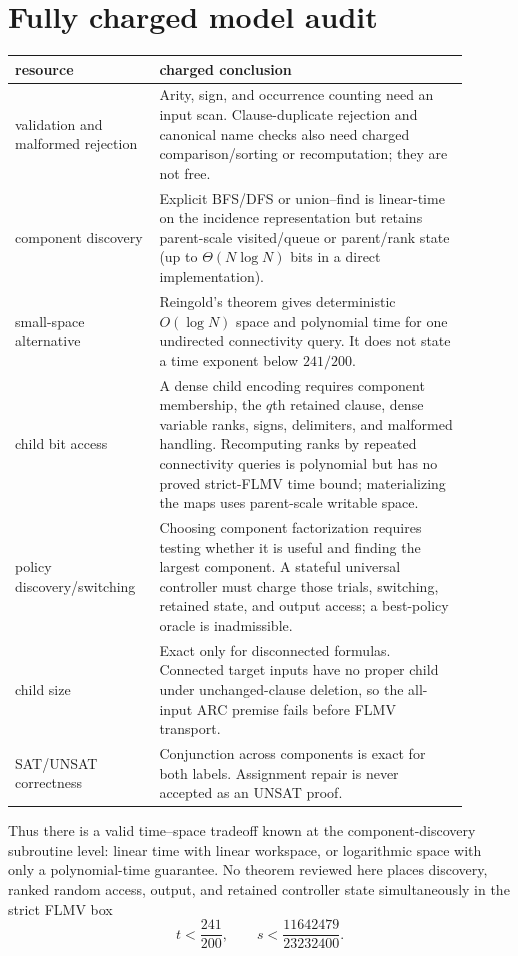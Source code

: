\documentclass[11pt]{article}
\begin{document}
\section{Fully charged model audit}
\begin{center}
\begin{tabular}{p{0.27\linewidth}p{0.63\linewidth}}
\toprule
resource & charged conclusion\\
\midrule
validation and malformed rejection & Arity, sign, and occurrence counting need
an input scan.  Clause-duplicate rejection and canonical name checks also need
charged comparison/sorting or recomputation; they are not free.\\
component discovery & Explicit BFS/DFS or union--find is linear-time on the
incidence representation but retains parent-scale visited/queue or parent/rank
state (up to $\Theta(N\log N)$ bits in a direct implementation).\\
small-space alternative & Reingold's theorem gives deterministic $O(\log N)$
space and polynomial time for one undirected connectivity query.  It does not
state a time exponent below $241/200$.\\
child bit access & A dense child encoding requires component membership, the
$q$th retained clause, dense variable ranks, signs, delimiters, and malformed
handling.  Recomputing ranks by repeated connectivity queries is polynomial but
has no proved strict-FLMV time bound; materializing the maps uses parent-scale
writable space.\\
policy discovery/switching & Choosing component factorization requires testing
whether it is useful and finding the largest component.  A stateful universal
controller must charge those trials, switching, retained state, and output
access; a best-policy oracle is inadmissible.\\
child size & Exact only for disconnected formulas.  Connected target inputs
have no proper child under unchanged-clause deletion, so the all-input ARC
premise fails before FLMV transport.\\
SAT/UNSAT correctness & Conjunction across components is exact for both labels.
Assignment repair is never accepted as an UNSAT proof.\\
\bottomrule
\end{tabular}
\end{center}
Thus there is a valid time--space tradeoff known at the component-discovery
subroutine level: linear time with linear workspace, or logarithmic space with
only a polynomial-time guarantee.  No theorem reviewed here places discovery,
ranked random access, output, and retained controller state simultaneously in
the strict FLMV box
\[
  t<\frac{241}{200},\qquad
  s<\frac{11642479}{23232400}.
\]
\end{document}
